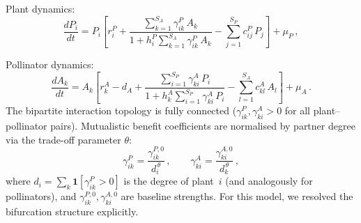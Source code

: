 \documentclass[pdflatex,sn-mathphys-num]{sn-jnl}%
\begin{document}
Plant dynamics:
\begin{equation}\label{eq:lever_plant}
 \frac{dP_i}{dt}
 = P_i\!\left[
  r^P_i
 + \frac{\sum_{k=1}^{S_A} \gamma^P_{ik}\,A_k}
   {1 + h^P_i\!\sum_{k=1}^{S_A} \gamma^P_{ik}\,A_k}
 - \sum_{j=1}^{S_P} c^P_{ij}\,P_j
 \right]
 + \mu_P\,,
\end{equation}

Pollinator dynamics:
\begin{equation}\label{eq:lever_poll}
 \frac{dA_k}{dt}
 = A_k\!\left[
  r^A_k - d_A
 + \frac{\sum_{i=1}^{S_P} \gamma^A_{ki}\,P_i}
   {1 + h^A_k\!\sum_{i=1}^{S_P} \gamma^A_{ki}\,P_i}
 - \sum_{l=1}^{S_A} c^A_{kl}\,A_l
 \right]
 + \mu_A\,.
\end{equation}
The bipartite interaction topology is fully connected ($\gamma^P_{ik},\gamma^A_{ki}>0$ for all plant--pollinator pairs). Mutualistic benefit coefficients are normalised by partner degree via the trade-off parameter $\theta$:
\begin{equation}
 \gamma^P_{ik} = \frac{\gamma^{P,0}_{ik}}{d_i^{\,\theta}}\,,
 \qquad
 \gamma^A_{ki} = \frac{\gamma^{A,0}_{ki}}{d_k^{\,\theta}}\,,
\end{equation}
where $d_i = \sum_k \mathbf{1}[\gamma^P_{ik}>0]$ is the degree of plant~$i$ (and analogously for pollinators), and $\gamma^{P,0}_{ik},\gamma^{A,0}_{ki}$ are baseline strengths.
For this model, we resolved the bifurcation structure explicitly. 
\end{document}
